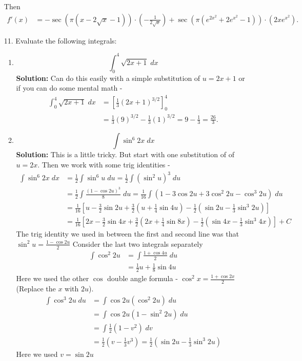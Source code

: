 \documentclass[11pt,reqno]{article}
\theoremstyle{definition}
\begin{document}
\begin{enumerate}
		Then
		\begin{align*}
			f'(x) &= - \sec(\pi(x - 2\sqrt{x} - 1)) \cdot (-\frac{1}{2\sqrt{x}}) + \sec(\pi(e^{2x^2 } + 2 e^{x^2 } - 1)) \cdot (2x e^{x^2 }).
		\end{align*}
		\newpage
		\item[11.] Evaluate the following integrals: 
		\begin{enumerate}
			\item $$\int_{0}^{4} \sqrt{2x + 1} \; dx$$
			\textbf{Solution:} Can do this easily with a simple substitution of $u = 2x + 1$ or if you can do some mental math - 
			\begin{align*}
				\int_{0}^{4} \sqrt{2x + 1} \; dx &= \left[\frac{1}{3} (2x + 1)^{3/2} \right]_{0}^{4} \\
				&= \frac{1}{3}(9)^{3/2} - \frac{1}{3}(1)^{3/2} = 9 - \frac{1}{3} = \frac{26}{3}.
			\end{align*}
			\item $$\int \sin^6 2x \; dx$$ 
			\textbf{Solution:} This is a little tricky. But start with one substitution of of $u = 2x$. Then we work with some trig identities - 
			\begin{align*}
				\int \sin^6 2x \; dx &= \frac{1}{2} \int \sin^6 u \; du = \frac{1}{2} \int (\sin^2 u )^{3} \; du \\
				&= \frac{1}{2} \int \frac{(1 - \cos 2u)^3}{8} \; du = \frac{1}{16} \int (1 - 3 \cos 2u + 3 \cos^2 2u - \cos^3 2u ) \; du \\
				&= \frac{1}{16} \left[ u - \frac{3}{2} \sin 2u + \frac{3}{2}\left(u + \frac{1}{4} \sin 4u \right) - \frac{1}{2} \left(\sin 2u - \frac{1}{3} \sin^3 2u\right) \right] \\
				&= \frac{1}{16} \left[ 2x - \frac{3}{2} \sin 4x + \frac{3}{2}\left(2x + \frac{1}{4} \sin 8x \right)- \frac{1}{2} \left(\sin 4x - \frac{1}{3} \sin^3 4x \right) \right] + C
			\end{align*}
			The trig identity we used in between the first and second line was that $\sin^2 u = \frac{1 - \cos 2u }{2}$
			Consider the last two integrals separately
			\begin{align*}
				\int \cos^2 2u &= \int \frac{1 + \cos 4u}{2} \;du \\
							  &= \frac{1}{2} u + \frac{1}{8} \sin 4u 
			\end{align*} 
			Here we used the other $\cos$ double angle formula - $\cos^2 x = \frac{1 + \cos 2x}{2}$ (Replace the $x$ with $2u$). 
			\begin{align*}
				\int \cos^3 2u \; du &= \int \cos 2u (\cos^2 2u) \; du \\
									 &= \int \cos 2u (1 - \sin^2 2u) \; du \\
									 &= \int \frac{1}{2}(1 - v^2) \; dv  \\
									 &= \frac{1}{2}(v - \frac{1}{3} v^3) = \frac{1}{2}(\sin 2u - \frac{1}{3} \sin^3 2u)
			\end{align*}
			Here we used $v = \sin 2u$ 
			

\end{enumerate}
\end{enumerate}
\end{document}
